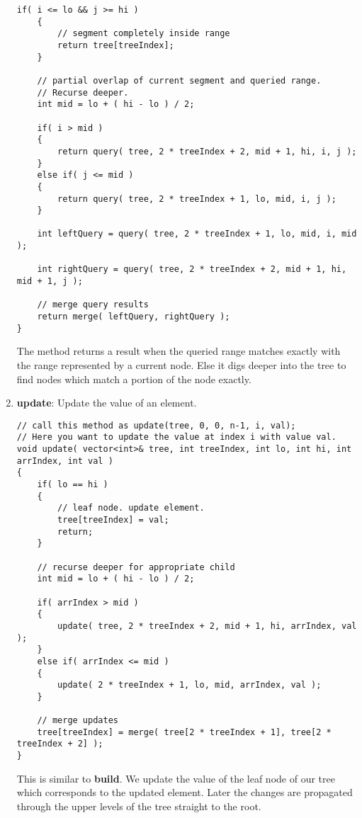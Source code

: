 \begin{enumerate}
\begin{lstlisting}[style=customc, caption={Query/Read}]
    if( i <= lo && j >= hi )
    {
        // segment completely inside range
        return tree[treeIndex];
    }

    // partial overlap of current segment and queried range.
    // Recurse deeper.
    int mid = lo + ( hi - lo ) / 2;

    if( i > mid )
    {
        return query( tree, 2 * treeIndex + 2, mid + 1, hi, i, j );
    }
    else if( j <= mid )
    {
        return query( tree, 2 * treeIndex + 1, lo, mid, i, j );
    }

    int leftQuery = query( tree, 2 * treeIndex + 1, lo, mid, i, mid );

    int rightQuery = query( tree, 2 * treeIndex + 2, mid + 1, hi, mid + 1, j );

    // merge query results
    return merge( leftQuery, rightQuery );
}
\end{lstlisting}
The method returns a result when the queried range matches exactly with the range represented by a current node. Else it digs deeper into the tree to find nodes which match a portion of the node exactly.

\item \textbf{update}: Update the value of an element.

\begin{lstlisting}[style=customc, caption={Update}]
// call this method as update(tree, 0, 0, n-1, i, val);
// Here you want to update the value at index i with value val.
void update( vector<int>& tree, int treeIndex, int lo, int hi, int arrIndex, int val )
{
    if( lo == hi )
    {
        // leaf node. update element.
        tree[treeIndex] = val;
        return;
    }

    // recurse deeper for appropriate child
    int mid = lo + ( hi - lo ) / 2;

    if( arrIndex > mid )
    {
        update( tree, 2 * treeIndex + 2, mid + 1, hi, arrIndex, val );
    }
    else if( arrIndex <= mid )
    {
        update( 2 * treeIndex + 1, lo, mid, arrIndex, val );
    }

    // merge updates
    tree[treeIndex] = merge( tree[2 * treeIndex + 1], tree[2 * treeIndex + 2] );
}
\end{lstlisting}
This is similar to \textbf{build}. We update the value of the leaf node of our tree which corresponds to the updated element. Later the changes are propagated through the upper levels of the tree straight to the root.
\end{enumerate}

